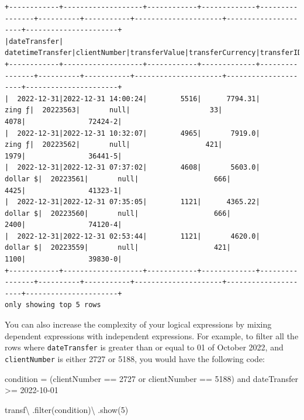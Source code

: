 \documentclass[
  11pt,
  letterpaper,
  DIV=11,
  numbers=noendperiod]{scrreprt}
\newenvironment{Shaded}{\begin{snugshade}}{\end{snugshade}}
\newcommand{\BuiltInTok}[1]{\textcolor[rgb]{0.00,0.23,0.31}{#1}}
\newcommand{\DecValTok}[1]{\textcolor[rgb]{0.68,0.00,0.00}{#1}}
\newcommand{\NormalTok}[1]{\textcolor[rgb]{0.00,0.23,0.31}{#1}}
\newcommand{\OperatorTok}[1]{\textcolor[rgb]{0.37,0.37,0.37}{#1}}
\newcommand{\StringTok}[1]{\textcolor[rgb]{0.13,0.47,0.30}{#1}}
\begin{document}
\begin{verbatim}
+------------+-------------------+------------+-------------+----------------+----------+-----------+---------------------+---------------------+----------------------+
|dateTransfer|   datetimeTransfer|clientNumber|transferValue|transferCurrency|transferID|transferLog|destinationBankNumber|destinationBankBranch|destinationBankAccount|
+------------+-------------------+------------+-------------+----------------+----------+-----------+---------------------+---------------------+----------------------+
|  2022-12-31|2022-12-31 14:00:24|        5516|      7794.31|          zing ƒ|  20223563|       null|                   33|                 4078|               72424-2|
|  2022-12-31|2022-12-31 10:32:07|        4965|       7919.0|          zing ƒ|  20223562|       null|                  421|                 1979|               36441-5|
|  2022-12-31|2022-12-31 07:37:02|        4608|       5603.0|        dollar $|  20223561|       null|                  666|                 4425|               41323-1|
|  2022-12-31|2022-12-31 07:35:05|        1121|      4365.22|        dollar $|  20223560|       null|                  666|                 2400|               74120-4|
|  2022-12-31|2022-12-31 02:53:44|        1121|       4620.0|        dollar $|  20223559|       null|                  421|                 1100|               39830-0|
+------------+-------------------+------------+-------------+----------------+----------+-----------+---------------------+---------------------+----------------------+
only showing top 5 rows
\end{verbatim}

You can also increase the complexity of your logical expressions by
mixing dependent expressions with independent expressions. For example,
to filter all the rows where \texttt{dateTransfer} is greater than or
equal to 01 of October 2022, and \texttt{clientNumber} is either 2727 or
5188, you would have the following code:

\begin{Shaded}
\begin{Highlighting}[]
\NormalTok{condition }\OperatorTok{=} \StringTok{\textquotesingle{}\textquotesingle{}\textquotesingle{}}
\StringTok{  (clientNumber == 2727 or clientNumber == 5188)}
\StringTok{  and dateTransfer \textgreater{}= \textquotesingle{}2022{-}10{-}01\textquotesingle{}}
\StringTok{\textquotesingle{}\textquotesingle{}\textquotesingle{}}

\NormalTok{transf}\OperatorTok{\textbackslash{}}
\NormalTok{  .}\BuiltInTok{filter}\NormalTok{(condition)}\OperatorTok{\textbackslash{}}
\NormalTok{  .show(}\DecValTok{5}\NormalTok{)}
\end{Highlighting}
\end{Shaded}
\end{document}

